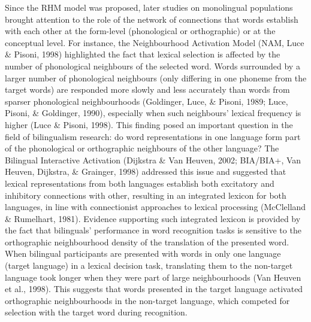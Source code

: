 \documentclass[
  english,
  man,floatsintext]{apa6}
\begin{document}
Since the RHM model was proposed, later studies on monolingual populations brought attention to the role of the network of connections that words establish with each other at the form-level (phonological or orthographic) or at the conceptual level. For instance, the Neighbourhood Activation Model (NAM, Luce \& Pisoni, 1998) highlighted the fact that lexical selection is affected by the number of phonological neighbours of the selected word. Words surrounded by a larger number of phonological neighbours (only differing in one phoneme from the target words) are responded more slowly and less accurately than words from sparser phonological neighbourhoods (Goldinger, Luce, \& Pisoni, 1989; Luce, Pisoni, \& Goldinger, 1990), especially when such neighbours' lexical frequency is higher (Luce \& Pisoni, 1998). This finding posed an important question in the field of bilingualism research: do word representations in one language form part of the phonological or orthographic neighbours of the other language? The Bilingual Interactive Activation (Dijkstra \& Van Heuven, 2002; BIA/BIA+, Van Heuven, Dijkstra, \& Grainger, 1998) addressed this issue and suggested that lexical representations from both languages establish both excitatory and inhibitory connections with other, resulting in an integrated lexicon for both languages, in line with connectionist approaches to lexical processing (McClelland \& Rumelhart, 1981). Evidence supporting such integrated lexicon is provided by the fact that bilinguals' performance in word recognition tasks is sensitive to the orthographic neighbourhood density of the translation of the presented word. When bilingual participants are presented with words in only one language (target language) in a lexical decision task, translating them to the non-target language took longer when they were part of large neighbourhoods (Van Heuven et al., 1998). This suggests that words presented in the target language activated orthographic neighbourhoods in the non-target language, which competed for selection with the target word during recognition.
\end{document}
